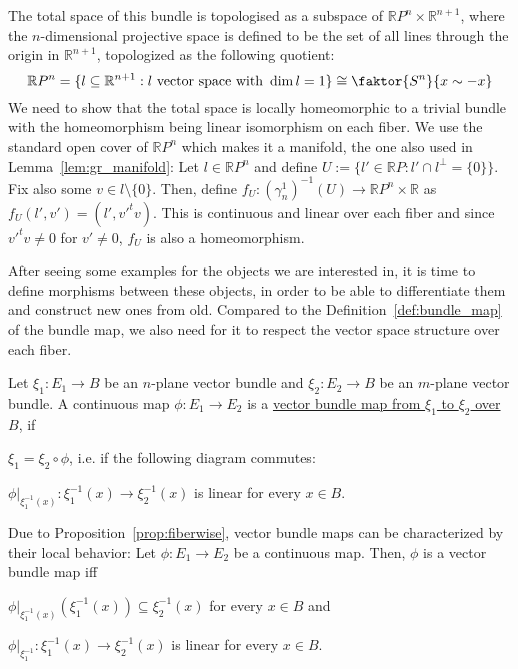 \begin{examples}
\begin{i_enum}
\begin{center}
\end{center}
The total space of this bundle is topologised as a subspace of $\mathbb{R}P^n\times\mathbb{R}^{n+1}$, where the $n$-dimensional projective space is defined to be the set of all lines through the origin in $\mathbb{R}^{n+1}$, topologized as the following quotient:
\[\mathbb{R}P^n=\{l\subseteq\mathbb{R}^{n+1}:l\text{ vector space with }\dim l=1\}\cong\faktor{S^n}{x\sim-x}\]
We need to show that the total space is locally homeomorphic to a trivial bundle with the homeomorphism being linear isomorphism on each fiber. We use the standard open cover of $\mathbb{R}P^n$ which makes it a manifold, the one also used in Lemma~\ref{lem:gr_manifold}: Let $l\in\mathbb{R}P^n$ and define $U:=\{l'\in\mathbb{R}P:l'\cap l^{\perp}=\{0\}\}$. Fix also some $v\in l\setminus\{0\}$. Then, define $f_U:(\gamma_n^1)^{-1}(U)\to\mathbb{R}P^n\times\mathbb{R}$ as 
$f_U(l',v')=(l',v'^tv)$.
This is continuous and linear over each fiber and since $v'^tv\neq0$ for $v'\neq0$, $f_U$ is also a homeomorphism.
\end{i_enum}
\end{examples}

After seeing some examples for the objects we are interested in, it is time to define morphisms between these objects, in order to be able to differentiate them and construct new ones from old. Compared to the Definition~\ref{def:bundle_map} of the bundle map, we also need for it to respect the vector space structure over each fiber.

\begin{definition}
Let $\xi_1:E_1\to B$ be an $n$-plane vector bundle and $\xi_2:E_2\to B$ be an $m$-plane vector bundle. A continuous map $\phi:E_1\to E_2$ is a \ul{vector bundle map from $\xi_1$ to $\xi_2$ over $B$}, if
\begin{i_enum}
\item $\xi_1=\xi_2\circ\phi$, i.e. if the following diagram commutes:
\begin{center}
\end{center}
\item $\phi|_{\xi_1^{-1}(x)}:\xi_1^{-1}(x)\to\xi_2^{-1}(x)$ is linear for every $x\in B$.
\end{i_enum}
\end{definition}
\begin{remark} Due to Proposition~\ref{prop:fiberwise}, vector bundle maps can be characterized by their local behavior: Let $\phi:E_1\to E_2$ be a continuous map. Then, $\phi$ is a vector bundle map iff
\begin{i_enum}
\item $\phi|_{\xi_1^{-1}(x)}(\xi_1^{-1}(x))\subseteq\xi_2^{-1}(x)$ for every $x\in B$ and
\item $\phi|_{\xi_1^{-1}}:\xi_1^{-1}(x)\to\xi_2^{-1}(x)$ is linear for every $x\in B$.
\end{i_enum}
\end{remark}

